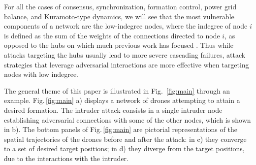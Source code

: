 \documentclass[%
 reprint,
 amsmath,amssymb,
 aip,
]{revtex4-2}
\theoremstyle{italichead}
\theoremstyle{definition}
\begin{document}
{For all the cases of consensus, synchronization, formation control, power grid balance, and Kuramoto-type dynamics, we will see that the most vulnerable components of a network are the low-indegree nodes, {where the indegree of node $i$ is defined as the sum of the weights of the connections directed to node $i$,} as opposed to the hubs on which much previous work has focused \cite{artime2024robustness}. Thus %
while 
{attacks targeting the hubs usually lead to more severe cascading failures, attack strategies that leverage adversarial interactions are more effective when targeting nodes with low indegree. }

The general theme of this paper is  illustrated in Fig.\ \ref{fig:main} through an example. %
Fig.\,\ref{fig:main} a) displays a network of drones attempting to attain a desired formation.  The intruder attack consists in a single intruder node establishing adversarial connections with some of the other nodes, which is shown in b). The bottom panels of Fig.\,\ref{fig:main} are pictorial representations of the spatial trajectories of the drones before and after the attack: in c)  they converge to a set of desired target positions;  in d) they diverge from the target positions, due to the interactions with the intruder.







}
\end{document}
